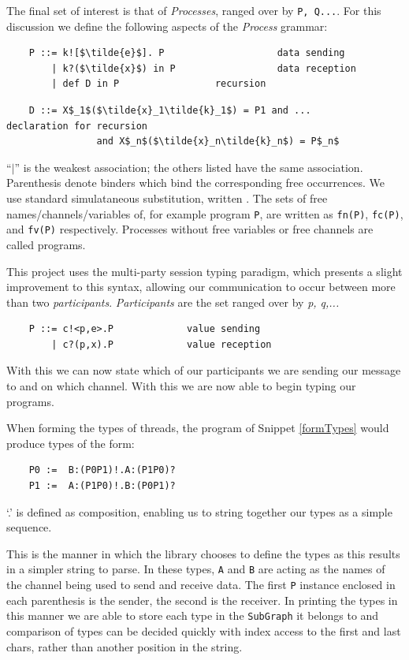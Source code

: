 \documentclass[11pt, abstracton, twoside]{scrartcl}
\begin{document}
The final set of interest is that of \emph{Processes}, ranged over 
by \texttt{P, Q...}. For this discussion we define the following aspects 
of the \emph{Process} grammar:
\\
\begin{lstlisting}
    P ::= k![$\tilde{e}$]. P                    data sending
        | k?($\tilde{x}$) in P                  data reception
        | def D in P                 recursion
\end{lstlisting}
\begin{lstlisting}
    D ::= X$_1$($\tilde{x}_1\tilde{k}_1$) = P1 and ...           declaration for recursion
                and X$_n$($\tilde{x}_n\tilde{k}_n$) = P$_n$ 
\end{lstlisting}

``$|$'' is the weakest association; the others listed have the same association. 
Parenthesis denote binders which bind the corresponding free occurrences. We use 
standard simulataneous substitution, written $ $. The sets of free 
names/channels/variables of, for example program \texttt{P}, are written as 
\texttt{fn(P)}, \texttt{fc(P)}, and \texttt{fv(P)} respectively. Processes without 
free variables or free channels are called programs.

This project uses the multi-party session typing paradigm, which presents a slight
improvement to this syntax, allowing our communication to occur between more
than two \emph{participants}. \emph{Participants} are the set ranged over by 
\emph{p, q,...}
\\
\begin{lstlisting}
    P ::= c!<p,e>.P             value sending
        | c?(p,x).P             value reception
\end{lstlisting}

With this we can now state which of our participants we are sending our message
to and on which channel. With this we are now able to begin typing our programs.

When forming the types of threads, the program of Snippet \ref{formTypes}
would produce types of the form:
\\
\begin{lstlisting}
    P0 :=  B:(P0P1)!.A:(P1P0)?
    P1 :=  A:(P1P0)!.B:(P0P1)?
\end{lstlisting}

`.' is defined as composition, enabling us to string together our types as
a simple sequence.

This is the manner in which the library chooses to define the types as this
results in a simpler string to parse. In these types, \texttt{A} and \texttt{B} 
are acting as the names of the channel being used to send and receive data.
The first \texttt{P} instance enclosed in each parenthesis is the sender, the 
second is the receiver. In printing the types in this manner we are able to 
store each type in the \texttt{SubGraph} it belongs to and comparison of types
can be decided quickly with index access to the first and last chars, rather than
another position in the string.
\end{document}
